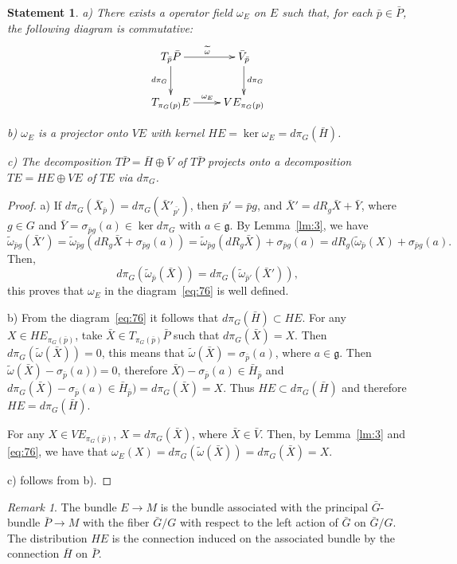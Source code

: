 \documentclass[12pt,letterpaper]{amsart}
\theoremstyle{definition}
\theoremstyle{plain}
\newtheorem{stat}{Statement}
\theoremstyle{remark}
\newtheorem{rem}{Remark}
\begin{document}
\begin{stat}
a) There exists a operator field $\omega_E$ on $E$ such that, for each $\bar{p} \in \bar{P}$, the following diagram is commutative:
\begin{equation}
\xymatrix{
T_{\bar{p}} \bar{P} \ar[r]^{\widetilde{\omega}} \ar[d]_{d\pi_G} & \bar{V}_{\bar{p}} \ar[d]^{d\pi_G}
\\
T_{\pi_G(p)} E \ar[r]^{\omega_E} & VE_{\pi_G(p)}
}
\label{eq:76}
\end{equation}

b) $\omega_E$ is a projector onto $VE$ with kernel $HE = \ker\omega_E = d\pi_G(\bar{H})$.

c) The decomposition $T\bar{P}= \bar{H} \oplus \bar{V}$ of $T\bar{P}$ projects onto a decomposition $TE=HE\oplus VE$ of $TE$ via $d\pi_G$.
\label{stat:11}
\end{stat}
\begin{proof}
a) If $d\pi_G(\bar{X}_{\bar{p}}) = d\pi_G(\bar{X}'_{\bar{p'}})$, then $\bar{p}' = \bar{p} g$, and $\bar{X}' = dR_g \bar{X} + \bar{Y}$, where $g \in G$ and $\bar{Y} = \sigma_{\bar{p} g}(a) \in \ker d\pi_G$ with $a \in \mathfrak{g}$.
By Lemma~\ref{lm:3}, we have
\begin{equation}
\widetilde{\omega}_{\bar{p} g}(\bar{X}') =\widetilde{\omega}_{\bar{p} g}(dR_g \bar{X} + \sigma_{\bar{p} g}(a)) =
\widetilde{\omega}_{\bar{p} g}(dR_g \bar{X}) + \sigma_{\bar{p} g}(a) =
dR_g (\widetilde{\omega}_{\bar{p}}(X) + \sigma_{\bar{p} g}(a).
\label{eq:77}
\end{equation}
Then,
\begin{equation}
d\pi_G(\widetilde{\omega}_{\bar{p}}(\bar{X})) = d\pi_G(\widetilde{\omega}_{\bar{p}'}(\bar{X}')),
\label{eq:78}
\end{equation}
this proves that $\omega_E$ in the diagram~\eqref{eq:76} is well defined.

b) From the diagram~\eqref{eq:76} it follows that $d\pi_G(\bar{H}) \subset HE$.
For any $X \in HE_{\pi_G(\bar{p})}$, take $\bar{X} \in T_{\pi_G(\bar{p})} \bar{P}$ such that $d\pi_G(\bar{X}) = X$.
Then $d\pi_G(\widetilde{\omega}(\bar{X})) = 0$, this means that $\widetilde{\omega}(\bar{X}) = \sigma_{\bar{p}}(a)$, where $a \in \mathfrak{g}$.
Then $\widetilde{\omega}(\bar{X}) - \sigma_{\bar{p}}(a)) = 0$, therefore $\bar{X}) - \sigma_{\bar{p}}(a) \in \bar{H}_{\bar{p}}$ and $d\pi_G(\bar{X}) - \sigma_{\bar{p}}(a) \in \bar{H}_{\bar{p}}) = d\pi_G(\bar{X}) = X$.
Thus $HE \subset d\pi_G(\bar{H})$ and therefore $HE = d\pi_G(\bar{H})$.

For any $X \in VE_{\pi_G(\bar{p})}$, $X = d\pi_G(\bar{X})$, where $\bar{X} \in \bar{V}$.
Then, by Lemma~\ref{lm:3} and \eqref{eq:76}, we have that $\omega_E(X) = d\pi_G(\widetilde{\omega}(\bar{X})) = d\pi_G(\bar{X}) = X$.

c) follows from b).
\end{proof}
\begin{rem}
The bundle $E \to M$ is the bundle associated with the principal $\bar{G}$-bundle $\bar{P} \to M$ with the fiber $\bar{G}/G$ with respect to the left action of $\bar{G}$ on $\bar{G}/G$.
The distribution $HE$ is the connection induced on the associated bundle by the connection $\bar{H}$ on $\bar{P}$.
\label{rem:9}
\end{rem}
\end{document}
